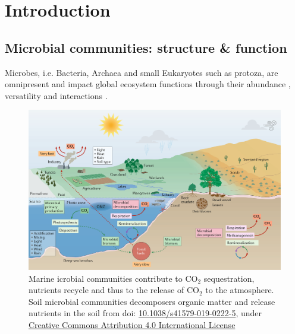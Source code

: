 \chapter{Introduction}
\label{cha:intro}


\section{Microbial communities: structure \& function}

Microbes, i.e. Bacteria, Archaea and small Eukaryotes such as protoza, are omnipresent and impact global ecosystem functions \citep{falkowski2008microbial} through their abundance \citep{bar2018biomass}, versatility \citep{rees2017improving} and interactions \citep{rottjers2018hairballs}. 



\begin{figure}[h]
   \centering
   \includegraphics[width=135mm]{figures/ecosystem_functioning.png}
   \caption{Marine icrobial communities contribute to CO$_2$ sequestration, nutrients recycle and thus to the release of CO$_2$ to the atmosphere. 
   Soil microbial communities decomposers organic matter and release nutrients in the soil 
   from \citep{cavicchioli2019scientists} doi: \href{https://doi.org/10.1038/s41579-019-0222-5}{10.1038/s41579-019-0222-5}, under \href{http://creativecommons.org/licenses/by/4.0 license}{Creative Commons Attribution 4.0 International License}
   }
\end{figure}




